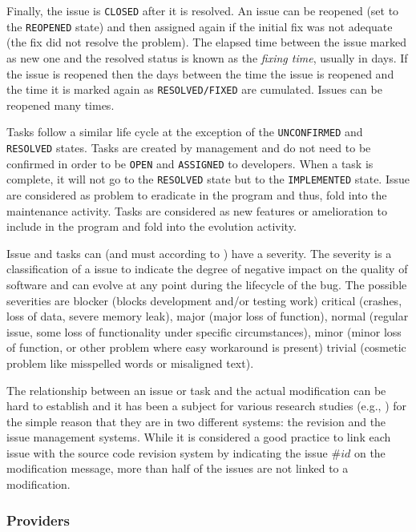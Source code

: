 Finally, the issue is {\tt CLOSED} after it is resolved. 
An issue can be reopened (set to the {\tt REOPENED} state) and then assigned again if the initial fix was not adequate (the fix did not resolve the problem). The elapsed time between the issue marked as new one and the resolved status is known as the {\it fixing time}, usually in days. 
If the issue is reopened then the days between the time the issue is reopened and the time it is marked again as {\tt RESOLVED/FIXED} are cumulated. Issues can be reopened many times.

Tasks follow a similar life cycle at the exception of the {\tt UNCONFIRMED} and {\tt RESOLVED} states. 
Tasks are created by management and do not need to be confirmed in order to be {\tt OPEN} and {\tt ASSIGNED} to developers. 
When a task is complete, it will not go to the {\tt RESOLVED} state but to the {\tt IMPLEMENTED} state. 
Issue are considered as problem to eradicate in the program and thus, fold into the maintenance activity.
Tasks are considered as new features or amelioration to include in the program and fold into the evolution activity.

Issue and tasks can (and must according to \cite{Bettenburg2008}) have a
severity. The severity is a classification of a issue to indicate the
degree of negative impact on the quality of software and can
evolve at any point during the lifecycle of the bug. The possible severities are blocker (blocks
development and/or testing work) critical (crashes, loss of
data, severe memory leak), major (major loss of function),
normal (regular issue, some loss of functionality under
specific circumstances), minor (minor loss of function, or
other problem where easy workaround is present) trivial
(cosmetic problem like misspelled words or misaligned text).


The relationship between an issue or task and the actual modification can be hard to establish and it has been a subject for various research studies (e.g., \cite{Antoniol2002,Bachmann2010,Wu2011}) for the simple reason that they are in two different systems: the revision and the issue management systems. While it is considered a good practice to link each issue with the source code revision system by indicating the issue $\#id$ on the modification message, more than half of the issues are not linked to a modification. 


\subsubsection{Providers\label{sec:bug-provider}}

